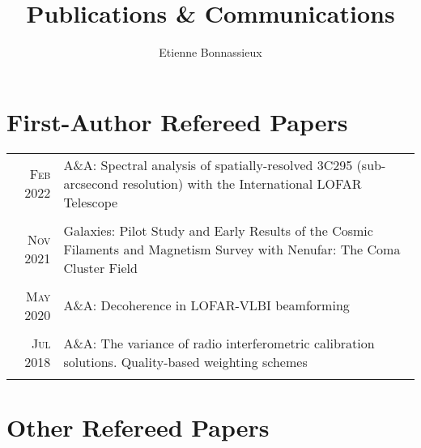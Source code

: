 \documentclass[11pt,a4paper,notitlepage]{article}
\author{Etienne Bonnassieux}
\title{Publications \& Communications}
\date{}
\begin{document}
\maketitle

\section{First-Author Refereed Papers}

\begin{tabular}{r|p{12.5cm}}
	
	\textsc{Feb 2022} & A\&A: Spectral analysis of spatially-resolved 3C295 (sub-arcsecond resolution) with the International LOFAR Telescope \citep{2022AA...658A..10B}\\
	\multicolumn{2}{c}{} \\

	
	\textsc{Nov 2021} & Galaxies: Pilot Study and Early Results of the Cosmic Filaments and Magnetism Survey with Nenufar: The Coma Cluster Field \citep{2021Galax...9..105B}\\
	\multicolumn{2}{c}{} \\
	
	\textsc{May 2020} & A\&A: Decoherence in LOFAR-VLBI beamforming \citep{2020AA...637A..51B}\\
	\multicolumn{2}{c}{} \\
	
	\textsc{Jul 2018} & A\&A: The variance of radio interferometric calibration solutions. Quality-based weighting schemes \citep{2018AA...615A..66B}\\
	\multicolumn{2}{c}{} \\
	
\end{tabular}


\section{Other Refereed Papers}
\end{document}
